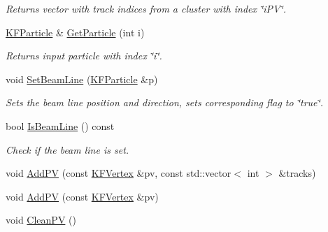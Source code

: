 \begin{DoxyCompactItemize}
\begin{DoxyCompactList}\small\item\em Returns vector with track indices from a cluster with index \char`\"{}i\+P\+V\char`\"{}. \end{DoxyCompactList}\item 
\hyperlink{classKFParticle}{K\+F\+Particle} \& \hyperlink{classKFParticlePVReconstructor_ab11011d9ec1bfe74140b8d6ccd3694de}{Get\+Particle} (int i)\hypertarget{classKFParticlePVReconstructor_ab11011d9ec1bfe74140b8d6ccd3694de}{}\label{classKFParticlePVReconstructor_ab11011d9ec1bfe74140b8d6ccd3694de}

\begin{DoxyCompactList}\small\item\em Returns input particle with index \char`\"{}i\char`\"{}. \end{DoxyCompactList}\item 
void \hyperlink{classKFParticlePVReconstructor_a5ab2c38c5b8191d733df5a086d6b1752}{Set\+Beam\+Line} (\hyperlink{classKFParticle}{K\+F\+Particle} \&p)\hypertarget{classKFParticlePVReconstructor_a5ab2c38c5b8191d733df5a086d6b1752}{}\label{classKFParticlePVReconstructor_a5ab2c38c5b8191d733df5a086d6b1752}

\begin{DoxyCompactList}\small\item\em Sets the beam line position and direction, sets corresponding flag to \char`\"{}true\char`\"{}. \end{DoxyCompactList}\item 
bool \hyperlink{classKFParticlePVReconstructor_a9440698721919c5168aa4996cea62296}{Is\+Beam\+Line} () const \hypertarget{classKFParticlePVReconstructor_a9440698721919c5168aa4996cea62296}{}\label{classKFParticlePVReconstructor_a9440698721919c5168aa4996cea62296}

\begin{DoxyCompactList}\small\item\em Check if the beam line is set. \end{DoxyCompactList}\item 
void \hyperlink{classKFParticlePVReconstructor_ac236151a1e4e21643e55747e7777bccb}{Add\+PV} (const \hyperlink{classKFVertex}{K\+F\+Vertex} \&pv, const std\+::vector$<$ int $>$ \&tracks)
\item 
void \hyperlink{classKFParticlePVReconstructor_a44b9ad35e87fa7feb800bd6abaa7f26f}{Add\+PV} (const \hyperlink{classKFVertex}{K\+F\+Vertex} \&pv)
\item 
void \hyperlink{classKFParticlePVReconstructor_a6da36a34efc1fc8eb3abb86280e52656}{Clean\+PV} ()\hypertarget{classKFParticlePVReconstructor_a6da36a34efc1fc8eb3abb86280e52656}{}\label{classKFParticlePVReconstructor_a6da36a34efc1fc8eb3abb86280e52656}


\end{DoxyCompactItemize}
